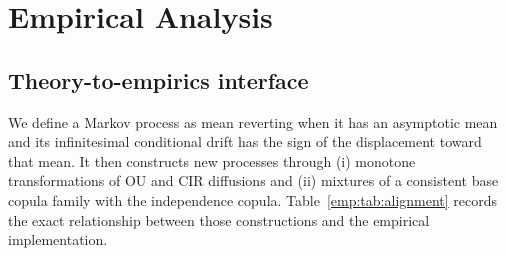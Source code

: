 \documentclass[11pt]{article}
\newcommand{\1}{\mathbf{1}}
\begin{document}
\fi
\section{Empirical Analysis}
\label{sec:empirical}

\subsection{Theory-to-empirics interface}
\label{emp:sec:alignment}

We define a Markov process as mean reverting when it has an asymptotic
mean and its infinitesimal conditional drift has the sign of the displacement
toward that mean.  It then constructs new processes through (i) monotone
transformations of OU and CIR diffusions and (ii) mixtures of a consistent base
copula family with the independence copula.  Table~\ref{emp:tab:alignment}
records the exact relationship between those constructions and the empirical
implementation.
\end{document}
